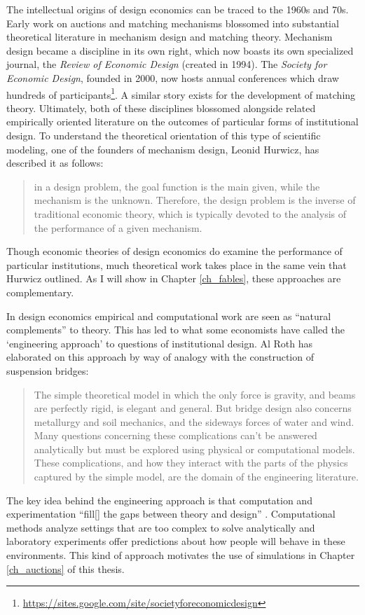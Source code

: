 The intellectual origins of design economics can be traced to the 1960s and 70s. Early work on auctions \autocite{vickrey1961} and matching mechanisms \autocite{gale1962} blossomed into substantial theoretical literature in mechanism design and matching theory. Mechanism design became a discipline in its own right, which now boasts its own specialized journal, the \textit{Review of Economic Design} (created in 1994). The \textit{Society for Economic Design}, founded in 2000, now hosts annual conferences which draw hundreds of participants\footnote{\url{https://sites.google.com/site/societyforeconomicdesign}}. A similar story exists for the development of matching theory. Ultimately, both of these disciplines blossomed alongside related empirically oriented literature on the outcomes of particular forms of institutional design. To understand the theoretical orientation of this type of scientific modeling, one of the founders of mechanism design, Leonid Hurwicz, has described it as follows:
\begin{quote}
	in a design problem, the goal function is the main given, while the mechanism is the unknown. Therefore, the design problem is the inverse of traditional economic theory, which is typically devoted to the analysis of the performance of a given mechanism. \autocite[30]{hurwicz2006designing}
\end{quote}
\noindent Though economic theories of design economics do examine the performance of particular institutions, much theoretical work takes place in the same vein that Hurwicz outlined. As I will show in Chapter \ref{ch_fables}, these approaches are complementary.

In design economics empirical and computational work are seen as ``natural complements'' \autocite[1363]{roth2002} to theory. This has led to what some economists have called the `engineering approach' to questions of institutional design. Al Roth has elaborated on this approach by way of analogy with the construction of suspension bridges:
\begin{quote}
	The simple theoretical model in which the only force is gravity, and beams are perfectly rigid, is elegant and general. But bridge design also concerns metallurgy and soil mechanics, and the sideways forces of water and wind. Many questions concerning these complications can’t be answered analytically but must be explored using physical or computational models. These complications, and how they interact with the parts of the physics captured by the simple model, are the domain of the engineering literature. \autocite[1342]{roth2002}
\end{quote}
\noindent The key idea behind the engineering approach is that computation and experimentation ``fill[] the gaps between theory and design'' \autocite[p1374]{roth2002}. Computational methods analyze settings that are too complex to solve analytically and laboratory experiments offer predictions about how people will behave in these environments. This kind of approach motivates the use of simulations in Chapter \ref{ch_auctions} of this thesis.

